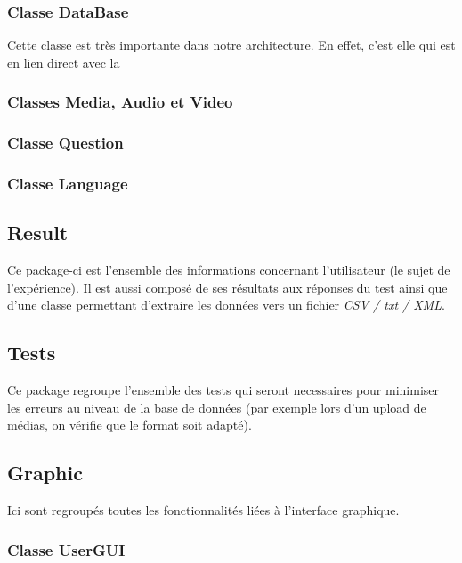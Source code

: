 \subsubsection{Classe DataBase}

Cette classe est très importante dans notre architecture. En effet, c'est elle qui est en lien direct avec la 

\subsubsection{Classes Media, Audio et Video}

\subsubsection{Classe Question}

\subsubsection{Classe Language}

\subsection{Result}

Ce package-ci est l'ensemble des informations concernant l'utilisateur (le sujet de l'expérience). Il est aussi composé de ses résultats aux réponses du test ainsi que d'une classe permettant d'extraire les données vers un fichier \textit{CSV / txt / XML}.

\subsection{Tests}

Ce package regroupe l'ensemble des tests qui seront necessaires pour minimiser les erreurs au niveau de la base de données (par exemple lors d'un upload de médias, on vérifie que le format soit adapté).

\subsection{Graphic}

Ici sont regroupés toutes les fonctionnalités liées à l'interface graphique.

\subsubsection{Classe UserGUI}


